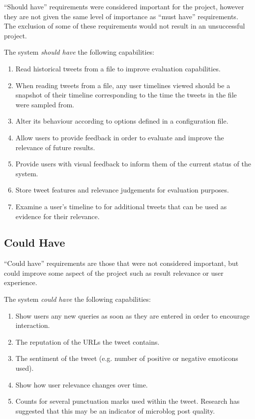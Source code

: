 \documentclass{l4proj}
\begin{document}
        ``Should have'' requirements were considered important for the project, however they are not given the same level of importance as ``must have'' requirements. The exclusion of some of these requirements would not result in an unsuccessful project.
        
        The system \textit{should have} the following capabilities:
        
        \begin{enumerate}
        \item Read historical tweets from a file to improve evaluation capabilities.
        \item When reading tweets from a file, any user timelines viewed should be a snapshot of their timeline corresponding to the time the tweets in the file were sampled from.
        \item Alter its behaviour according to options defined in a configuration file.
        \item Allow users to provide feedback in order to evaluate and improve the relevance of future results.
        \item Provide users with visual feedback to inform them of the current status of the system.
        \item Store tweet features and relevance judgements for evaluation purposes.
        \item Examine a user's timeline to for additional tweets that can be used as evidence for their relevance.
        \end{enumerate}

        \subsection{Could Have}
        ``Could have'' requirements are those that were not considered important, but could improve some aspect of the project such as result relevance or user experience.
        
        The system \textit{could have} the following capabilities:
        
        \begin{enumerate}
        \item Show users any new queries as soon as they are entered in order to encourage interaction.
        \item The reputation of the URLs the tweet contains.
        \item The sentiment of the tweet (e.g. number of positive or negative emoticons used).
        \item Show how user relevance changes over time.
        \item Counts for several punctuation marks used within the tweet. Research has suggested that this may be an indicator of microblog post quality. %
        \end{enumerate}
        
\end{document}
